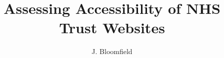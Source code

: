\documentclass[12pt]{third-rep}
\title{Assessing Accessibility of NHS Trust Websites}
\author{J. Bloomfield}
\begin{document}
\setlength{\headheight}{15pt}

\dotitleandabstract\

\tableofcontents
\listoffigures
\listoftables









~\nocite{Abascal2019ToolsFW} %




\appendix

\end{document}
